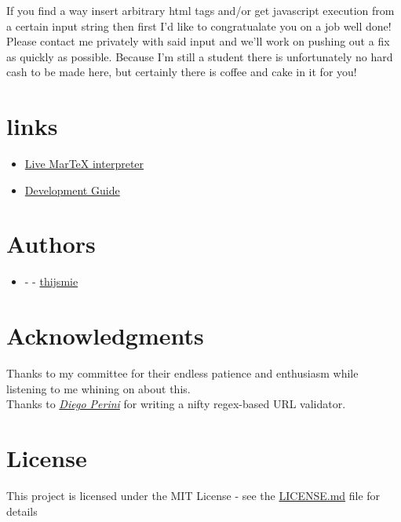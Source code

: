 \begin{page}
If you find a way insert arbitrary html tags and/or get javascript execution from a certain input string then first I'd like to congratualate you on a job well done! Please contact me privately with said input and we'll work on pushing out a fix as quickly as possible. Because I'm still a student there is unfortunately no hard cash to be made here, but certainly there is coffee and cake in it for you!

\section{links}

\begin{itemize}
   \item \href{http://tmiedema.com/martex}{Live MarTeX interpreter}
   \item \href{http://tmiedema.com/martex/development.html}{Development Guide}
\end{itemize}

\section{Authors}

\begin{itemize}
  \item {} -  - \href{https://github.com/thijsmie}{thijsmie}
\end{itemize}

\section{Acknowledgments}

Thanks to my committee for their endless patience and enthusiasm while listening to me whining on about this.
\\
Thanks to \href{http://www.iport.it}{\textit{Diego Perini}} for writing a nifty regex-based URL validator.

\section{License}

This project is licensed under the MIT License - see the \href{LICENSE.md}{LICENSE.md} file for details



\end{page}